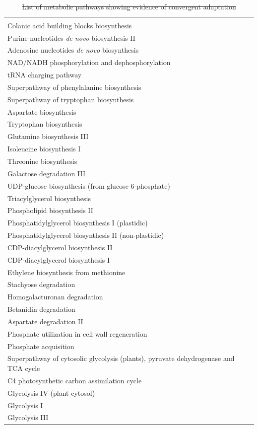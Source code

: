 \begin{table}[h]	
	\caption[]{\st{List of metabolic pathways showing evidence of convergent adaptation}\hspace*{0.3cm}} 
			\centering
			\textbf{}\\[-2mm]
			{\fontsize{7}{11}\sf
		    \begin{tabular}{l} \hline\hline\\[-3mm]
		    Colanic acid building blocks biosynthesis\\
		    Purine nucleotides \textit{de novo} biosynthesis II\\	    
		    Adenosine nucleotides \textit{de novo} biosynthesis\\
NAD/NADH phosphorylation and dephosphorylation\\
tRNA charging pathway\\
Superpathway of phenylalanine biosynthesis\\
Superpathway of tryptophan biosynthesis\\
Aspartate biosynthesis\\
Tryptophan biosynthesis\\
Glutamine biosynthesis III\\
Isoleucine biosynthesis I\\
Threonine biosynthesis\\
Galactose degradation III\\
UDP-glucose biosynthesis (from glucose 6-phosphate)\\
Triacylglycerol biosynthesis\\
Phospholipid biosynthesis II\\
Phosphatidylglycerol biosynthesis I (plastidic)\\
Phosphatidylglycerol biosynthesis II (non-plastidic)\\
CDP-diacylglycerol biosynthesis II\\
CDP-diacylglycerol biosynthesis I\\
Ethylene biosynthesis from methionine\\
Stachyose degradation\\
Homogalacturonan degradation\\
Betanidin degradation\\
Aspartate degradation II\\
Phosphate utilization in cell wall regeneration\\
Phosphate acquisition\\
Superpathway of cytosolic glycolysis (plants), pyruvate dehydrogenase and TCA cycle\\
C4 photosynthetic carbon assimilation cycle\\
Glycolysis IV (plant cytosol)\\
Glycolysis I\\
Glycolysis III\\
		      \hline\hline
		    \end{tabular}
		    \label{supp:metabo}  %
		}
\end{table}

